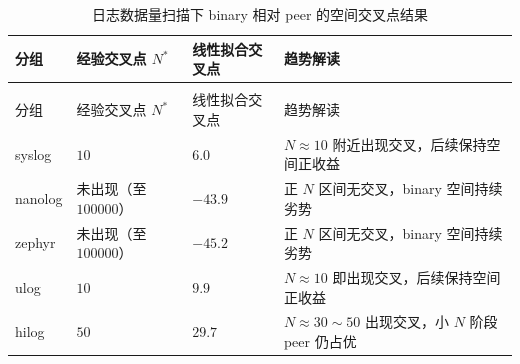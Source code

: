 \begin{longtable}[]{@{}
  >{\centering\arraybackslash}p{}
  >{\centering\arraybackslash}p{}
  >{\centering\arraybackslash}p{}
  >{\raggedright\arraybackslash}p{}@{}}
\caption{日志数据量扫描下 binary 相对 peer 的空间交叉点结果}\label{tbl:space-crossover}\tabularnewline
\toprule\noalign{}
\begin{minipage}[t]{\hsize}\centering
分组
\end{minipage} & \begin{minipage}[t]{\hsize}\centering
经验交叉点 \(N^*\)
\end{minipage} & \begin{minipage}[t]{\hsize}\centering
线性拟合交叉点
\end{minipage} & \begin{minipage}[t]{\hsize}\centering
趋势解读
\end{minipage} \\
\midrule\noalign{}
\endfirsthead
\multicolumn{4}{r}{（续表\thetable）} \\
\toprule\noalign{}
\begin{minipage}[t]{\hsize}\centering
分组
\end{minipage} & \begin{minipage}[t]{\hsize}\centering
经验交叉点 \(N^*\)
\end{minipage} & \begin{minipage}[t]{\hsize}\centering
线性拟合交叉点
\end{minipage} & \begin{minipage}[t]{\hsize}\centering
趋势解读
\end{minipage} \\
\midrule\noalign{}
\endhead
\bottomrule\noalign{}
\endlastfoot
syslog & \(10\) & \(6.0\) & \(N\approx10\) 附近出现交叉，后续保持空间正收益 \\
nanolog & 未出现（至 \(100000\)） & \(-43.9\) & 正 \(N\) 区间无交叉，binary 空间持续劣势 \\
zephyr & 未出现（至 \(100000\)） & \(-45.2\) & 正 \(N\) 区间无交叉，binary 空间持续劣势 \\
ulog & \(10\) & \(9.9\) & \(N\approx10\) 即出现交叉，后续保持空间正收益 \\
hilog & \(50\) & \(29.7\) & \(N\approx30\sim50\) 出现交叉，小 \(N\) 阶段 peer 仍占优 \\
\end{longtable}

